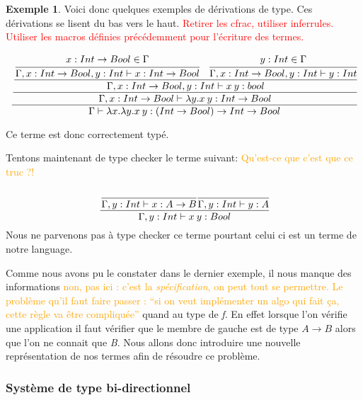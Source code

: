 \documentclass {article}
\theoremstyle{definition}
\newtheorem{example}{Exemple}
\theoremstyle{remark}
\newcommand{\todo}[1]{\textcolor{red}{#1}}
\newcommand{\attention}[1]{\textcolor{orange}{#1}}
\begin{document}
\begin{example}
  \label{probleme:type_simple}
  Voici donc quelques exemples de dérivations de type.  Ces
  dérivations se lisent du bas vers le haut.  \todo{Retirer les cfrac,
    utiliser inferrules. Utiliser les macros définies précédemment
    pour l'écriture des termes.}

  \begin{align*}
    \cfrac{
      \cfrac{
        \cfrac{
          \cfrac{x:Int\rightarrow Bool \in \Gamma}{\Gamma,x:Int\rightarrow Bool,y:Int\vdash x:Int\rightarrow Bool}\:\:\:\:%
          \cfrac{y:Int\in \Gamma}{\Gamma,x:Int\rightarrow Bool,y:Int\vdash y:Int}%
        }{\Gamma,x:Int\rightarrow Bool,y:Int\vdash \App{x}{y} : bool}%
      }{\Gamma,x:Int\rightarrow Bool\vdash \Lam{y}{\App{x}{y}}:Int \rightarrow Bool}%
    }{\Gamma\vdash \Lam{x}{\Lam{y}{\App{x}{y}}}:(Int\rightarrow Bool) \rightarrow Int \rightarrow Bool} %
  \end{align*}

  Ce terme est donc correctement typé.


  Tentons maintenant de type checker le terme suivant:   \attention{Qu'est-ce que c'est que ce truc ?!}
  \begin{align*}
    \cfrac{
      \cfrac{}{\Gamma,y:Int\vdash x:A\rightarrow B}%
      \cfrac{}{\Gamma,y:Int\vdash y:A}%
    }{\Gamma,y:Int\vdash\App{x}{y}:Bool}%
  \end{align*}
  Nous ne parvenons pas à type checker ce terme pourtant celui ci est un terme de notre language.
\end{example}

Comme nous avons pu le constater dans le dernier exemple, il nous
manque des informations \attention{non, pas ici : c'est la
  \emph{spécification}, on peut tout se permettre. Le problème qu'il
  faut faire passer : ``si on veut implémenter un algo qui fait ça,
  cette règle va être compliquée''} quand au type de \emph{f}. En
effet lorsque l'on vérifie une application il faut vérifier que le
membre de gauche est de type $A \rightarrow B$ alors que l'on ne
connait que \emph{B}. Nous allons donc introduire une nouvelle
représentation de nos termes afin de résoudre ce problème.

\subsubsection{Système de type bi-directionnel}
\end{document}
